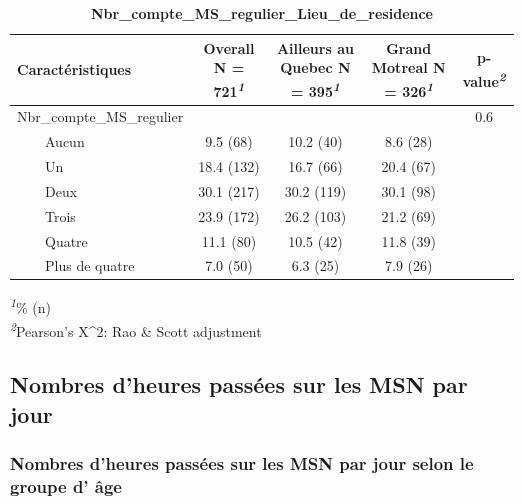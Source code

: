 \documentclass[
]{article}
\begin{document}
\newpage
\begin{table}[!t]
\caption{\label{tab:unnamed-chunk-50}\textbf{Nbr\_compte\_MS\_regulier\_Lieu\_de\_residence}} 
\fontsize{12.0pt}{14.4pt}\selectfont
\begin{tabular*}{\linewidth}{@{\extracolsep{\fill}}lcccc}
\toprule
\textbf{Caractéristiques} & \textbf{Overall}  N = 721\textsuperscript{\textit{1}} & \textbf{Ailleurs au Quebec}  N = 395\textsuperscript{\textit{1}} & \textbf{Grand Motreal}  N = 326\textsuperscript{\textit{1}} & \textbf{p-value}\textsuperscript{\textit{2}} \\ 
\midrule\addlinespace[2.5pt]
Nbr\_compte\_MS\_regulier &  &  &  & 0.6 \\ 
    Aucun & 9.5 (68) & 10.2 (40) & 8.6 (28) &  \\ 
    Un & 18.4 (132) & 16.7 (66) & 20.4 (67) &  \\ 
    Deux & 30.1 (217) & 30.2 (119) & 30.1 (98) &  \\ 
    Trois & 23.9 (172) & 26.2 (103) & 21.2 (69) &  \\ 
    Quatre & 11.1 (80) & 10.5 (42) & 11.8 (39) &  \\ 
    Plus de quatre & 7.0 (50) & 6.3 (25) & 7.9 (26) &  \\ 
\bottomrule
\end{tabular*}
\begin{minipage}{\linewidth}
\textsuperscript{\textit{1}}\% (n)\\
\textsuperscript{\textit{2}}Pearson's X\^{}2: Rao \& Scott adjustment\\
\end{minipage}
\end{table}

\hypertarget{nombres-dheures-passuxe9es-sur-les-msn-par-jour}{%
\subsection{Nombres d'heures passées sur les MSN par
jour}\label{nombres-dheures-passuxe9es-sur-les-msn-par-jour}}

\hypertarget{nombres-dheures-passuxe9es-sur-les-msn-par-jour-selon-le-groupe-d-uxe2ge}{%
\subsubsection{Nombres d'heures passées sur les MSN par jour selon le
groupe d'
âge}\label{nombres-dheures-passuxe9es-sur-les-msn-par-jour-selon-le-groupe-d-uxe2ge}}
\end{document}
